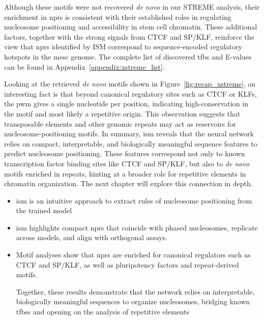 \documentclass[11pt]{book}
\begin{document}
Although these motifs were not recovered \textit{de novo} in our STREME analysis, their enrichment in \glspl{npr} is consistent with their established roles in regulating nucleosome positioning and accessibility in stem cell chromatin. These additional factors, together with the strong signals from CTCF and SP/KLF, reinforce the view that \glspl{npr} identified by ISM correspond to sequence-encoded regulatory hotspots in the \gls{mesc} genome. The complete list of discovered \gls{tfbs} and E-values can be found in Appendix~\ref{appendix:xstreme_list}.

Looking at the retrieved \textit{de novo} motifs shown in Figure~\ref{fig:recap_xstreme}, an interesting fact is that beyond canonical regulatory sites such as CTCF or KLFs, the \gls{pwm} gives a single nucleotide per position, indicating high-conservation in the motif and most likely a repetitive origin. This observation suggests that transposable elements and other genomic repeats may act as reservoirs for nucleosome-positioning motifs. In summary, \gls{ism} reveals that the neural network relies on compact, interpretable, and biologically meaningful sequence features to predict nucleosome positioning. These features correspond not only to known transcription factor binding sites like CTCF and SP/KLF, but also to \textit{de novo} motifs enriched in repeats, hinting at a broader role for repetitive elements in chromatin organization. The next chapter will explore this connection in depth.

\begin{tcolorbox}[title=Chapter summary, colframe=pink, colback=pink!10!white,coltitle=black, fonttitle=\bfseries]
    \begin{itemize}
        \item \gls{ism} is an intuitive approach to extract rules of nucleosome positioning from the trained model
        \item \gls{ism} highlights compact \glspl{npr} that coincide with phased nucleosomes, replicate across models, and align with orthogonal assays.
        \item Motif analyses show that \glspl{npr} are enriched for canonical regulators such as CTCF and SP/KLF, as well as pluripotency factors and repeat-derived motifs. 
        
        Together, these results demonstrate that the network relies on interpretable, biologically meaningful sequences to organize nucleosomes, bridging known \glspl{tfbs} and opening on the analysis of repetitive elements
    \end{itemize}
\end{tcolorbox}
\end{document}

